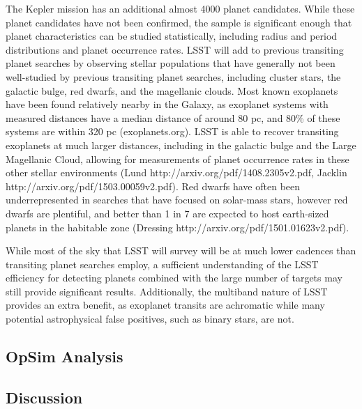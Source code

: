 The Kepler mission has an additional almost 4000 planet candidates. While these planet candidates have not been confirmed, the sample is significant enough that planet characteristics can be studied statistically, including radius and period distributions and planet occurrence rates. LSST will add to previous transiting planet searches by observing stellar populations that have generally not been well-studied by previous transiting planet searches, including cluster stars, the galactic bulge, red dwarfs, and the magellanic clouds. Most known exoplanets have been found relatively nearby in the Galaxy, as exoplanet systems with measured distances have a median distance of around 80 pc, and 80\% of these systems are within 320 pc (exoplanets.org). LSST is able to recover transiting exoplanets at much larger distances, including in the galactic bulge and the Large Magellanic Cloud, allowing for measurements of planet occurrence rates in these other stellar environments (Lund http://arxiv.org/pdf/1408.2305v2.pdf, Jacklin http://arxiv.org/pdf/1503.00059v2.pdf). Red dwarfs have often been underrepresented in searches that have focused on solar-mass stars, however red dwarfs are plentiful, and better than 1 in 7 are expected to host earth-sized planets in the habitable zone (Dressing http://arxiv.org/pdf/1501.01623v2.pdf).

While most of the sky that LSST will survey will be at much lower cadences than transiting planet searches employ, a sufficient understanding of the LSST efficiency for detecting planets combined with the large number of targets may still provide significant results. Additionally, the multiband nature of LSST provides an extra benefit, as exoplanet transits are achromatic while many potential astrophysical false positives, such as binary stars, are not.


\subsection{OpSim Analysis}
\label{sec:\secname:analysis}




\subsection{Discussion}
\label{sec:\secname:discussion}


\navigationbar
